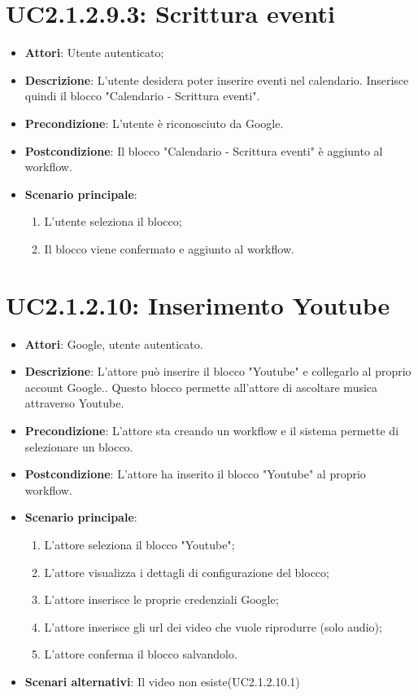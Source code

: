 \section{UC2.1.2.9.3: Scrittura eventi}
\label{UC2.1.2.9.3}
\begin{itemize}
	\item \textbf{Attori}: Utente autenticato;
	\item \textbf{Descrizione}: L'utente desidera poter inserire eventi nel calendario. Inserisce quindi il blocco "Calendario - Scrittura eventi".
	\item \textbf{Precondizione}: L'utente è riconosciuto da Google.
	\item \textbf{Postcondizione}: Il blocco "Calendario - Scrittura eventi" è aggiunto al workflow.
	\item \textbf{Scenario principale}:
	\begin{enumerate} \item L'utente seleziona il blocco;  \item  Il blocco viene confermato e aggiunto al workflow.\end{enumerate}
\end{itemize}


\section{UC2.1.2.10: Inserimento Youtube}
\label{UC2.1.2.10}
\begin{itemize}
	\item \textbf{Attori}: Google, utente autenticato.
	\item \textbf{Descrizione}: L'attore può inserire il blocco "Youtube" e collegarlo al proprio account Google.. Questo blocco permette all'attore di ascoltare musica attraverso Youtube.
	\item \textbf{Precondizione}: L'attore sta creando un workflow e il sistema permette di selezionare un blocco.
	\item \textbf{Postcondizione}: L'attore ha inserito il blocco "Youtube" al proprio workflow.
	\item \textbf{Scenario principale}:
	\begin{enumerate} \item L'attore seleziona il blocco "Youtube";  \item L'attore visualizza i dettagli di configurazione del blocco; \item  L'attore inserisce le proprie credenziali Google;  \item  L'attore inserisce gli url dei video che vuole riprodurre (solo audio); \item L'attore conferma il blocco salvandolo.\end{enumerate}
	\item \textbf{Scenari alternativi}:
	Il video non esiste(UC2.1.2.10.1)
\end{itemize}


